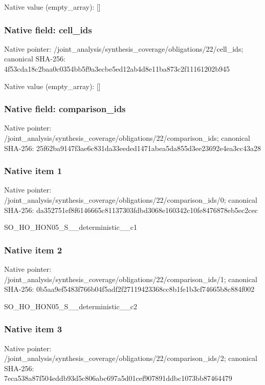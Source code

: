 \documentclass[10pt,a4paper]{article}
\begin{document}
Native value (empty\_\allowbreak{}array): []

\subsubsection{Native field: cell\_\allowbreak{}ids}
Native pointer: /joint\_\allowbreak{}analysis/synthesis\_\allowbreak{}coverage/obligations/22/cell\_\allowbreak{}ids; canonical SHA-256: 4f53cda18c2baa0c0354bb5f9a3ecbe5ed12ab4d8e11ba873c2f11161202b945

Native value (empty\_\allowbreak{}array): []

\subsubsection{Native field: comparison\_\allowbreak{}ids}
Native pointer: /joint\_\allowbreak{}analysis/synthesis\_\allowbreak{}coverage/obligations/22/comparison\_\allowbreak{}ids; canonical SHA-256: 25f62ba9147f3ae6c831da33eeded1471abea5da855d3ee23692e4ea3cc43a28

\subsubsection{Native item 1}
Native pointer: /joint\_\allowbreak{}analysis/synthesis\_\allowbreak{}coverage/obligations/22/comparison\_\allowbreak{}ids/0; canonical SHA-256: da352751ef8f6146665c81137303fdbd3068e160342c10fe8476878eb5ec2cec

\begingroup\raggedright\sloppy SO\_\allowbreak{}HO\_\allowbreak{}HON05\_\allowbreak{}S\_\allowbreak{}\_\allowbreak{}deterministic\_\allowbreak{}\_\allowbreak{}c1\par\endgroup

\subsubsection{Native item 2}
Native pointer: /joint\_\allowbreak{}analysis/synthesis\_\allowbreak{}coverage/obligations/22/comparison\_\allowbreak{}ids/1; canonical SHA-256: 0b5aa9ef5483f766b04f5adf2f27119423368cc8b1fe1b3cf74665b8c884f002

\begingroup\raggedright\sloppy SO\_\allowbreak{}HO\_\allowbreak{}HON05\_\allowbreak{}S\_\allowbreak{}\_\allowbreak{}deterministic\_\allowbreak{}\_\allowbreak{}c2\par\endgroup

\subsubsection{Native item 3}
Native pointer: /joint\_\allowbreak{}analysis/synthesis\_\allowbreak{}coverage/obligations/22/comparison\_\allowbreak{}ids/2; canonical SHA-256: 7eca538a87f504eddb93d5c806abc697a5d01cef907891ddbc1073bb87464479
\end{document}
